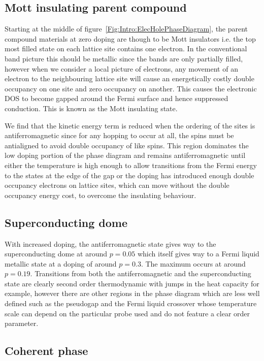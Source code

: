 \subsection{Mott insulating parent compound}

Starting at the middle of figure~\ref{Fig:Intro:ElecHolePhaseDiagram}, the parent compound materials at zero doping are though to be Mott insulators i.e. the top most filled state on each lattice site contains one electron. In the conventional band picture this should be metallic since the bands are only partially filled, however when we consider a local picture of electrons, any movement of an electron to the neighbouring lattice site will cause an energetically costly double occupancy on one site and zero occupancy on another. This causes the electronic \ac{DOS} to become gapped around the Fermi surface and hence suppressed conduction. This is known as the Mott insulating state.

We find that the kinetic energy term is reduced when the ordering of the sites is antiferromagnetic since for any hopping to occur at all, the spins must be antialigned to avoid double occupancy of like spins. This region dominates the low doping portion of the phase diagram and remains antiferromagnetic until either the temperature is high enough to allow transitions from the Fermi energy to the states at the edge of the gap or the doping has introduced enough double occupancy electrons on lattice sites, which can move without the double occupancy energy cost, to overcome the insulating behaviour.

\subsection{Superconducting dome}

With increased doping, the antiferromagnetic state gives way to the superconducting dome at around $p=0.05$ which itself gives way to a Fermi liquid metallic state at a doping of around $p=0.3$. The maximum \Tc occurs at around $p=0.19$. Transitions from both the antiferromagnetic and the superconducting state are clearly second order thermodynamic with jumps in the heat capacity for example, however there are other regions in the phase diagram which are less well defined such as the pseudogap and the Fermi liquid crossover whose temperature scale can depend on the particular probe used and do not feature a clear order parameter.

\subsection{Coherent phase}

